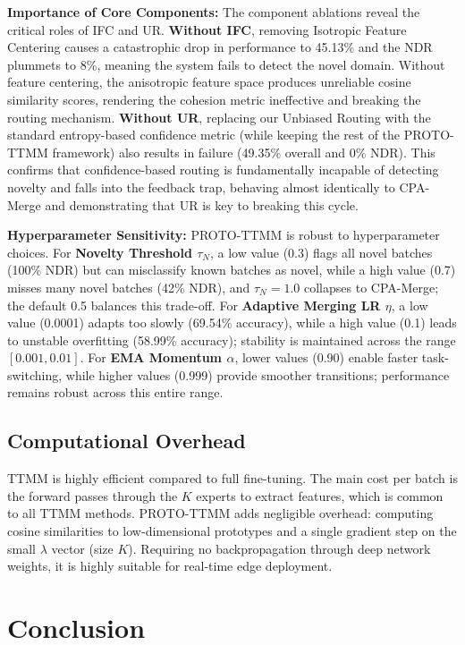 \documentclass[twoside]{article}
\begin{document}
\textbf{Importance of Core Components:} The component ablations reveal the critical roles of IFC and UR. \textbf{Without IFC}, removing Isotropic Feature Centering causes a catastrophic drop in performance to 45.13\% and the NDR plummets to 8\%, meaning the system fails to detect the novel domain. Without feature centering, the anisotropic feature space produces unreliable cosine similarity scores, rendering the cohesion metric ineffective and breaking the routing mechanism. \textbf{Without UR}, replacing our Unbiased Routing with the standard entropy-based confidence metric (while keeping the rest of the PROTO-TTMM framework) also results in failure (49.35\% overall and 0\% NDR). This confirms that confidence-based routing is fundamentally incapable of detecting novelty and falls into the feedback trap, behaving almost identically to CPA-Merge and demonstrating that UR is key to breaking this cycle.

\textbf{Hyperparameter Sensitivity:} PROTO-TTMM is robust to hyperparameter choices. For \textbf{Novelty Threshold $\tau_N$}, a low value (0.3) flags all novel batches (100\% NDR) but can misclassify known batches as novel, while a high value (0.7) misses many novel batches (42\% NDR), and $\tau_N=1.0$ collapses to CPA-Merge; the default 0.5 balances this trade-off. For \textbf{Adaptive Merging LR $\eta$}, a low value (0.0001) adapts too slowly (69.54\% accuracy), while a high value (0.1) leads to unstable overfitting (58.99\% accuracy); stability is maintained across the range $[0.001, 0.01]$. For \textbf{EMA Momentum $\alpha$}, lower values (0.90) enable faster task-switching, while higher values (0.999) provide smoother transitions; performance remains robust across this entire range.

\subsection{Computational Overhead}

TTMM is highly efficient compared to full fine-tuning. The main cost per batch is the forward passes through the $K$ experts to extract features, which is common to all TTMM methods. PROTO-TTMM adds negligible overhead: computing cosine similarities to low-dimensional prototypes and a single gradient step on the small $\lambda$ vector (size $K$). Requiring no backpropagation through deep network weights, it is highly suitable for real-time edge deployment.

\section{Conclusion}
\label{sec:conclusion}
\end{document}
